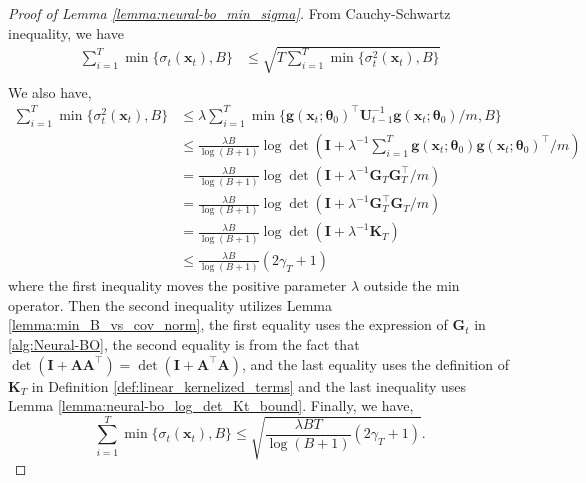 \begin{proof}[Proof of Lemma \ref{lemma:neural-bo_min_sigma}]

From Cauchy-Schwartz inequality, we have 
\begin{equation*}
    \begin{split}
        \sum_{i=1}^T \min \{\sigma_t(\mathbf{x}_t), B\} & \leq \sqrt{T \sum_{i=1}^T \min \{\sigma_t^2(\mathbf{x}_t), B\}} \\
    \end{split}
\end{equation*}
We also have, 
\begin{equation*}
    \begin{split}
        \sum_{i=1}^T \min \{\sigma_t^2 (\mathbf{x}_t), B\} & \leq \lambda \sum_{i=1}^T \min \{ \mathbf{g}(\mathbf{x}_t;\boldsymbol{\theta}_0)^\top \mathbf{U}^{-1}_{t-1} \mathbf{g}(\mathbf{x}_t;\boldsymbol{\theta}_0)/m,B \} 
        \\
        & \leq \frac{\lambda B}{\log(B+1)}  \log \det (\mathbf{I} + \lambda^{-1} \sum_{i=1}^T \mathbf{g}(\mathbf{x}_t;\boldsymbol{\theta}_0) \mathbf{g}(\mathbf{x}_t;\boldsymbol{\theta}_0)^\top /m) \\
        & = \frac{\lambda B}{\log(B+1)}  \log \det (\mathbf{I}  + \lambda^{-1} \mathbf{G}_T \mathbf{G}_T^\top /m ) \\
        & = \frac{\lambda B}{\log(B+1)}\log \det (\mathbf{I}  + \lambda^{-1} \mathbf{G}_T^\top \mathbf{G}_T /m ) \\
        & = \frac{\lambda B}{\log(B+1)} \log \det (\mathbf{I}  + \lambda^{-1} \mathbf{K}_T)\\
        & \leq  \frac{\lambda B}{\log(B+1)} (2\gamma_T+1)
    \end{split}
\end{equation*}
where the first inequality moves the positive parameter $\lambda$ outside the min operator. Then the second inequality utilizes Lemma \ref{lemma:min_B_vs_cov_norm}, the first equality uses the expression of $\mathbf{G}_t$ in \ref{alg:Neural-BO}, the second equality is from the fact that $\det(\mathbf{I} + \mathbf{A}\mathbf{A}^\top) = \det(\mathbf{I} + \mathbf{A}^\top\mathbf{A})$, and the last equality uses the definition of $\mathbf{K}_T$ in Definition \ref{def:linear_kernelized_terms} and the last inequality uses Lemma \ref{lemma:neural-bo_log_det_Kt_bound}. Finally, we have, 
\[
\sum_{i=1}^T \min \{\sigma_t(\mathbf{x}_t), B\} \leq \sqrt{\frac{\lambda BT}{\log(B+1)} (2\gamma_T+1)}.
\]
\end{proof}

